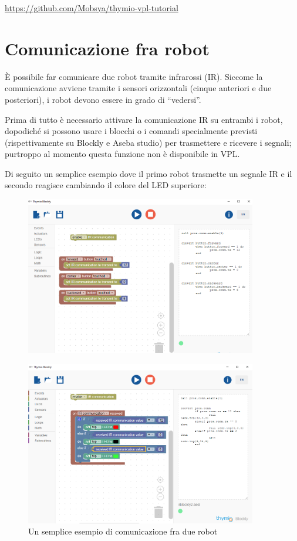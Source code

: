 \documentclass[12pt]{article}
\begin{document}
		\url{https://github.com/Mobsya/thymio-vpl-tutorial}
	
	
\section{Comunicazione fra robot}\label{network}

	È possibile far comunicare due robot tramite infrarossi (IR). Siccome la comunicazione avviene tramite i sensori orizzontali (cinque anteriori e due posteriori), i robot devono essere in grado di ``vedersi''.
	
	Prima di tutto è necessario attivare la comunicazione IR su entrambi i robot, dopodiché si possono usare i blocchi o i comandi specialmente previsti (rispettivamente su Blockly e Aseba studio) per trasmettere e ricevere i segnali; purtroppo al momento questa funzione non è disponibile in VPL. 
	
	Di seguito un semplice esempio dove il primo robot trasmette un segnale IR e il secondo reagisce cambiando il colore del LED superiore: 
	
	\begin{figure}[H]
		\centering
		\includegraphics[width=0.9\textwidth]{img/blocklyIR1.png}
		\label{blocklyIR1}
	\end{figure}
		
	\begin{figure}[H]
		\centering
		\includegraphics[width=0.9\textwidth]{img/blocklyIR2.png}
		\caption{Un semplice esempio di comunicazione fra due robot}
		\label{blocklyIR2}
	\end{figure}
	
\end{document}
